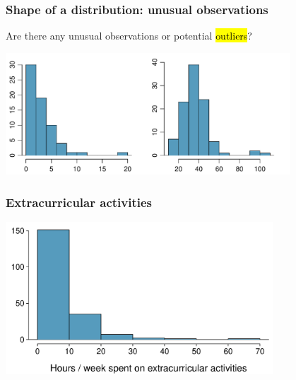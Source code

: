 \begin{frame}
\frametitle{Shape of a distribution: unusual observations}

Are there any unusual observations or potential \hl{outliers}?

\begin{center}
\includegraphics[width=0.8\textwidth]{1-6_numerical_data/figures/outlierPlots/outlierPlots}
\end{center}

\end{frame}


\begin{frame}
\frametitle{Extracurricular activities}


\begin{center}
\includegraphics[width=0.75\textwidth]{1-6_numerical_data/figures/extracurr_hrs_hist/extracurr_hrs_hist}
\end{center}


\end{frame}


